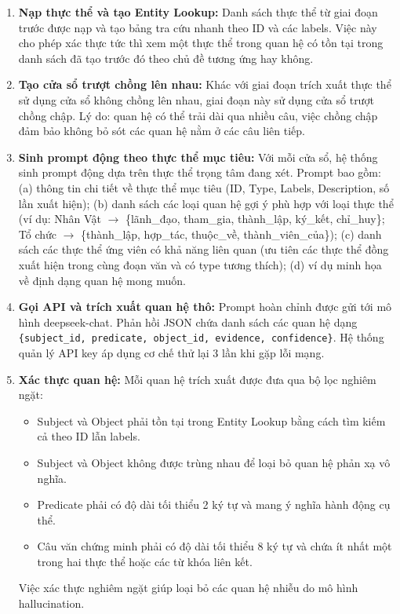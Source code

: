 \begin{enumerate}
    \item \textbf{Nạp thực thể và tạo Entity Lookup:} Danh sách thực thể từ giai đoạn trước được nạp và tạo bảng tra cứu nhanh theo ID và các labels. Việc này cho phép xác thực tức thì xem một thực thể trong quan hệ có tồn tại trong danh sách đã tạo trước đó theo chủ đề tương ứng hay không.

    \item \textbf{Tạo cửa sổ trượt chồng lên nhau:} Khác với giai đoạn trích xuất thực thể sử dụng cửa sổ không chồng lên nhau, giai đoạn này sử dụng cửa sổ trượt chồng chập. Lý do: quan hệ có thể trải dài qua nhiều câu, việc chồng chập đảm bảo không bỏ sót các quan hệ nằm ở các câu liên tiếp.

    \item \textbf{Sinh prompt động theo thực thể mục tiêu:} Với mỗi cửa sổ, hệ thống sinh prompt động dựa trên thực thể trọng tâm đang xét. Prompt bao gồm: (a) thông tin chi tiết về thực thể mục tiêu (ID, Type, Labels, Description, số lần xuất hiện); (b) danh sách các loại quan hệ gợi ý phù hợp với loại thực thể (ví dụ: Nhân Vật $\rightarrow$ \{lãnh\_đạo, tham\_gia, thành\_lập, ký\_kết, chỉ\_huy\}; Tổ chức $\rightarrow$ \{thành\_lập, hợp\_tác, thuộc\_về, thành\_viên\_của\}); (c) danh sách các thực thể ứng viên có khả năng liên quan (ưu tiên các thực thể đồng xuất hiện trong cùng đoạn văn và có type tương thích); (d) ví dụ minh họa về định dạng quan hệ mong muốn.

    \item \textbf{Gọi API và trích xuất quan hệ thô:} Prompt hoàn chỉnh được gửi tới mô hình deepseek-chat. Phản hồi JSON chứa danh sách các quan hệ dạng \texttt{\{subject\_id, predicate, object\_id, evidence, confidence\}}. Hệ thống quản lý API key áp dụng cơ chế thử lại 3 lần khi gặp lỗi mạng.

    \item \textbf{Xác thực quan hệ:} Mỗi quan hệ trích xuất được đưa qua bộ lọc nghiêm ngặt:
    \begin{itemize}
        \item Subject và Object phải tồn tại trong Entity Lookup bằng cách tìm kiếm cả theo ID lẫn labels.
        \item Subject và Object không được trùng nhau để loại bỏ quan hệ phản xạ vô nghĩa.
        \item Predicate phải có độ dài tối thiểu 2 ký tự và mang ý nghĩa hành động cụ thể.
        \item Câu văn chứng minh phải có độ dài tối thiểu 8 ký tự và chứa ít nhất một trong hai thực thể hoặc các từ khóa liên kết.
    \end{itemize}
    Việc xác thực nghiêm ngặt giúp loại bỏ các quan hệ nhiễu do mô hình hallucination.


\end{enumerate}
